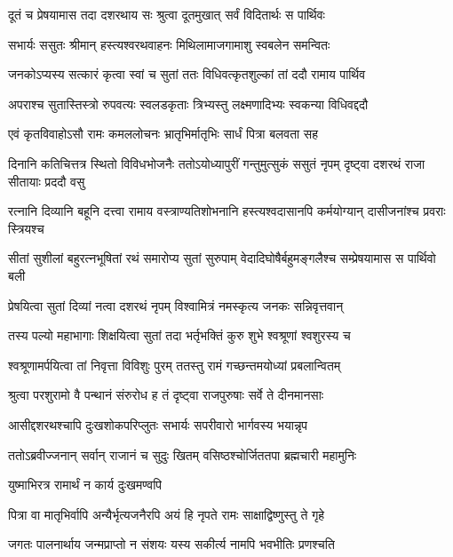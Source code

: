 \twolineshloka
{दूतं च प्रेषयामास तदा दशरथाय सः}
{श्रुत्वा दूतमुखात् सर्वं विदितार्थः स पार्थिवः} %

\twolineshloka
{सभार्यः ससुतः श्रीमान् हस्त्यश्वरथवाहनः}
{मिथिलामाजगामाशु स्वबलेन समन्वितः} %

\twolineshloka
{जनकोऽप्यस्य सत्कारं कृत्वा स्वां च सुतां ततः}
{विधिवत्कृतशुल्कां तां ददौ रामाय पार्थिव} %

\twolineshloka
{अपराश्च सुतास्तिस्त्रो रुपवत्यः स्वलडकृताः}
{त्रिभ्यस्तु लक्ष्मणादिभ्यः स्वकन्या विधिवद्ददौ} %

\twolineshloka
{एवं कृतविवाहोऽसौ रामः कमललोचनः}
{भ्रातृभिर्मातृभिः सार्धं पित्रा बलवता सह} %

\threelineshloka
{दिनानि कतिचित्तत्र स्थितो विविधभोजनैः}
{ततोऽयोध्यापुरीं गन्तुमुत्सुकं ससुतं नृपम्}
{दृष्ट्वा दशरथं राजा सीतायाः प्रददौ वसु} %

\fourlineindentedshloka
{रत्नानि दिव्यानि बहूनि दत्त्वा}
{रामाय वस्त्राण्यतिशोभनानि}
{हस्त्यश्वदासानपि कर्मयोग्यान्}
{दासीजनांश्च प्रवराः स्त्रियश्च} %

\fourlineindentedshloka
{सीतां सुशीलां बहुरत्नभूषितां}
{रथं समारोप्य सुतां सुरुपाम्}
{वेदादिघोषैर्बहुमङ्गलैश्च}
{सम्प्रेषयामास स पार्थिवो बली} %

\twolineshloka
{प्रेषयित्वा सुतां दिव्यां नत्वा दशरथं नृपम्}
{विश्वामित्रं नमस्कृत्य जनकः सन्निवृत्तवान्} %

\twolineshloka
{तस्य पल्यो महाभागाः शिक्षयित्वा सुतां तदा}
{भर्तृभक्तिं कुरु शुभे श्वश्रूणां श्वशुरस्य च} %

\twolineshloka
{श्वश्रूणामर्पयित्वा तां निवृत्ता विविशुः पुरम्}
{ततस्तु रामं गच्छन्तमयोध्यां प्रबलान्वितम्} %

\twolineshloka
{श्रुत्वा परशुरामो वै पन्थानं संरुरोध ह}
{तं दृष्ट्वा राजपुरुषाः सर्वे ते दीनमानसाः} %

\twolineshloka
{आसीद्दशरथश्चापि दुःखशोकपरिप्लुतः}
{सभार्यः सपरीवारो भार्गवस्य भयान्नृप} %

\twolineshloka
{ततोऽब्रवीज्जनान् सर्वान् राजानं च सुदुः खितम्}
{वसिष्ठश्चोर्जिततपा ब्रह्मचारी महामुनिः} %


\onelineshloka
{युष्माभिरत्र रामार्थं न कार्य दुःखमण्वपि} %

\twolineshloka
{पित्रा वा मातृभिर्वापि अन्यैर्भृत्यजनैरपि}
{अयं हि नृपते रामः साक्षाद्विष्णुस्तु ते गृहे} %

\twolineshloka
{जगतः पालनार्थाय जन्मप्राप्तो न संशयः}
{यस्य सकीर्त्य नामपि भवभीतिः प्रणश्चति} %

